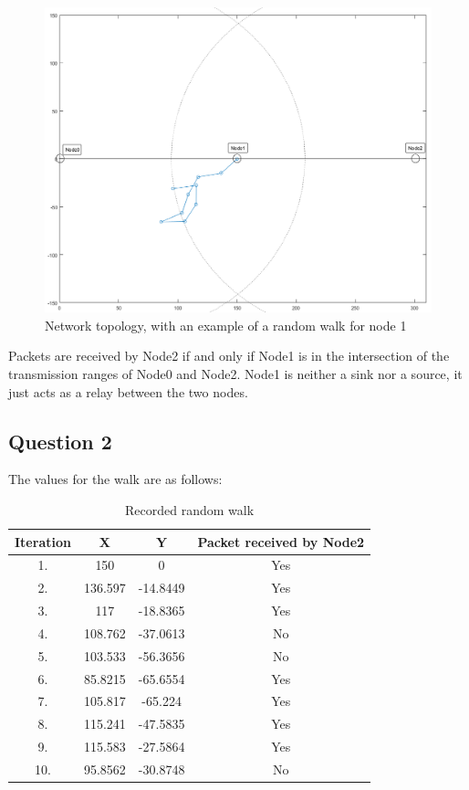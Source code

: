 \documentclass[11pt,journal]{article}
\begin{document}
	\begin{figure}[h]
		\centering
		\includegraphics[scale=0.4]{lab4ii_walk_matlab.png}
		\caption{Network topology, with an example of a random walk for node 1}
	\end{figure}
	Packets are received by Node2 if and only if Node1 is in the intersection of the transmission ranges of Node0 and Node2. Node1 is neither a sink nor a source, it just acts as a relay between the two nodes.
	\subsection{Question 2}
	The values for the walk are as follows:
	\begin{table}[h]
		\centering
		\begin{tabular}{|c|c|c|c|}
			\hline
			Iteration & X & Y & Packet received by Node2\\
			\hline
			1. & 150 & 0 & Yes\\
			\hline
			2. & 136.597 & -14.8449 & Yes\\
			\hline
			3. & 117 & -18.8365 & Yes\\
			\hline
			4. & 108.762 & -37.0613 & No\\
			\hline
			5. & 103.533 & -56.3656 & No\\
			\hline
			6. & 85.8215 & -65.6554 & Yes\\
			\hline
			7. & 105.817 & -65.224 & Yes\\
			\hline
			8. & 115.241 & -47.5835 & Yes\\
			\hline
			9. & 115.583 & -27.5864 & Yes\\
			\hline
			10. & 95.8562 & -30.8748 & No\\
			\hline
		\end{tabular}
	\caption{Recorded random walk}
	
	\end{table}
\end{document}
